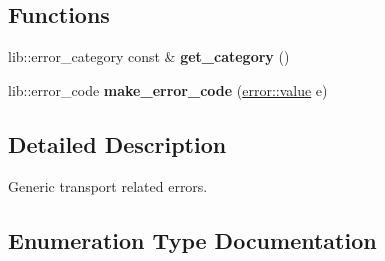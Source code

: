 \subsection*{Functions}
\begin{DoxyCompactItemize}
\item 
lib\+::error\+\_\+category const  \& {\bfseries get\+\_\+category} ()\hypertarget{namespacewebsocketpp_1_1transport_1_1error_a25da4a3fca81d81e59802628924fd122}{}\label{namespacewebsocketpp_1_1transport_1_1error_a25da4a3fca81d81e59802628924fd122}

\item 
lib\+::error\+\_\+code {\bfseries make\+\_\+error\+\_\+code} (\hyperlink{namespacewebsocketpp_1_1transport_1_1error_a8d371a2562d813e5a2e106e2694d4fb0}{error\+::value} e)\hypertarget{namespacewebsocketpp_1_1transport_1_1error_a7e7e335d77a9007c14af4d941a2baa93}{}\label{namespacewebsocketpp_1_1transport_1_1error_a7e7e335d77a9007c14af4d941a2baa93}

\end{DoxyCompactItemize}


\subsection{Detailed Description}
Generic transport related errors. 

\subsection{Enumeration Type Documentation}
